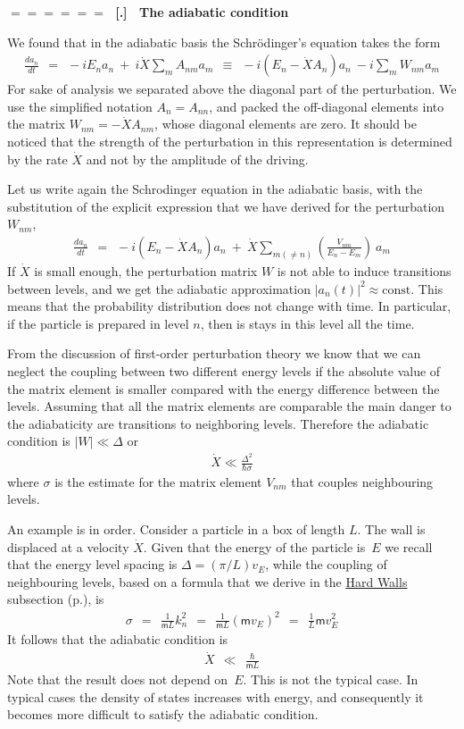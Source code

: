 \documentclass[onecolumn,fleqn]{revtex4}
\newcommand{\const}{\mathrm{const}}
\newcommand{\mass}{\mathsf{m}}
\newcommand{\beq}{\begin{eqnarray}}
\newcommand{\eeq}{\end{eqnarray}}
\renewcommand{\thesubsection}{\arabic{subsection}}
\renewcommand{\thesubsubsection}{\arabic{subsubsection}}
\newcommand{\sheadC}[1]
{
\addtocounter{subsubsection}{1}
\vspace{5mm}
{\Large\bf $=\!=\!=\!=\!=\!=\;$ [\thesubsection.\thesubsubsection] \ #1}  
\nopagebreak
\phantomsection
}
\begin{document}
 
\sheadC{The adiabatic condition}

We found that in the adiabatic basis 
the Schr\"{o}dinger's equation takes the form
\beq
\frac{d a_n}{dt} 
\ \ = \ \ -i E_n a_n \ + \ i \dot{X}\sum_m A_{nm} a_m 
 \ \ \equiv \ \ -i(E_n-\dot{X}A_n)a_n \ -i\sum_m W_{nm} a_m 
\eeq
For sake of analysis we separated above  
the diagonal part of the perturbation.
We use the simplified notation $A_n=A_{nn}$, 
and packed the off-diagonal elements 
into the matrix $W_{nm}=-\dot{X}A_{nm}$,
whose diagonal elements are zero. 
It should be noticed that the strength of the perturbation in this 
representation is determined by the rate $\dot{X}$ and not by 
the amplitude of the driving. 

Let us write again the Schrodinger equation 
in the adiabatic basis, with the substitution 
of the explicit expression that we have derived 
for the perturbation $W_{nm}$,  
\beq
\frac{d a_n}{dt} \ \ = \ \ 
-i(E_n-\dot{X}A_n)a_n 
\ + \ 
\dot{X} \sum_{m (\ne n)} \left(\frac{V_{nm}}{E_n-E_m}\right) \ a_m
\eeq
If $\dot{X}$ is small enough,  
the perturbation matrix $W$ is not able to induce 
transitions between levels, 
and we get the adiabatic 
approximation $|a_n(t)|^2 \approx \const$.
This means that the probability distribution 
does not change with time. In particular, 
if the particle is prepared in level $n$, 
then is stays in this level all the time. 


From the discussion of first-order 
perturbation theory we know that we can neglect the coupling 
between two different energy levels if the absolute value of 
the matrix element is smaller compared with the 
energy difference between the levels. 
Assuming that all the matrix elements are 
comparable the main danger to the adiabaticity 
are transitions to neighboring levels.  
Therefore the adiabatic condition is ${|W| \ll \Delta}$ or 
\beq
\dot{X} \ll \frac{\Delta^2}{\hbar \sigma} 
\eeq
where $\sigma$ is the estimate for the 
matrix element $V_{nm}$ that couples 
neighbouring levels.


An example is in order. Consider a particle in a box of length ${L}$. 
The wall is displaced at a velocity ${\dot{X}}$. 
Given that the energy of the particle is~$E$ we recall that 
the energy level spacing is ${\Delta = (\pi/L)v_E }$,   
while the coupling of neighbouring levels, based on a formula 
that we derive in the \hyperref[sWalls]{Hard Walls} subsection (p.\pageref{sWalls}), is 
\beq
\sigma \ \ = \ \ \frac{1}{\mass L} k_n^2 
\ \ = \ \ \frac{1}{\mass L} (\mass v_E)^2
\ \ = \ \ \frac{1}{L} \mass v_E^2
\eeq
It follows that the adiabatic condition is 
\beq
\dot{X} \ \ \ll \ \ \frac{\hbar}{\mass L} 
\eeq
Note that the result does not depend on~$E$. 
This is not the typical case. In typical cases 
the density of states increases with energy, 
and consequently it becomes more difficult 
to satisfy the adiabatic condition.  
\end{document}
